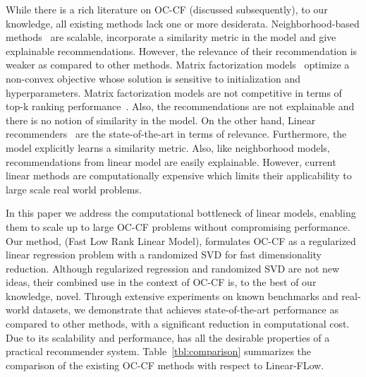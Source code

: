 \documentclass{article}
\newcommand{\citep}{\cite}
\begin{document}
While there is a rich literature on OC-CF (discussed subsequently),
to our knowledge, all existing methods lack one
or more desiderata. Neighborhood-based methods~\citep{Sarwar:2001,Linden:2003} are scalable, incorporate a similarity metric in the model and give explainable recommendations. However, the relevance of their recommendation is weaker as compared to other methods. Matrix factorization models~\citep{Hu:2008} optimize a non-convex objective whose solution is sensitive to initialization and hyperparameters. Matrix factorization models are  %
not competitive in terms of top-k ranking performance~\cite{Ning:2011,Sedhain:2016}. Also, the recommendations are not explainable and there is no notion of similarity in the model. On the other hand, Linear recommenders~\cite{Ning:2011,Sedhain:2016} are the state-of-the-art in terms of relevance. Furthermore, the model explicitly learns a similarity metric. Also, like neighborhood models, recommendations from linear model are easily explainable. However, current linear methods are computationally expensive which limits their applicability to large scale real world problems.

In this paper we address the computational bottleneck of linear models, enabling them to scale up to large OC-CF problems without compromising performance. Our method, \LinearLow (Fast Low Rank Linear Model), formulates OC-CF as a regularized linear regression problem with a randomized SVD for fast dimensionality reduction.
Although regularized regression and randomized SVD are not new ideas,  their combined use in the context of OC-CF is,  to the best of our knowledge, novel.
Through extensive experiments on known benchmarks and real-world datasets, we demonstrate that \LinearLow achieves state-of-the-art performance as
compared to other methods, with a significant reduction in computational cost.  Due to its scalability and performance,
\LinearLow has all the desirable properties of a practical recommender system. Table~\ref{tbl:comparison} summarizes the comparison of the existing OC-CF methods with respect to Linear-FLow.
\end{document}
